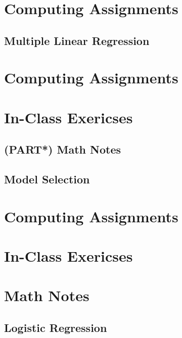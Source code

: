 \documentclass[]{book}
\begin{document}
\part*{Computing
Assignments}\label{part-computing-assignments-1}

\chapter{Multiple Linear Regression}\label{mlr}

\part*{Computing
Assignments}\label{part-computing-assignments-2}

\part*{In-Class Exericses}\label{part-in-class-exericses}

\chapter{(PART*) Math Notes}\label{part-math-notes}

\chapter{Model Selection}\label{select}

\part*{Computing
Assignments}\label{part-computing-assignments-3}

\part*{In-Class Exericses}\label{part-in-class-exericses-1}

\part*{Math Notes}\label{part-math-notes-1}

\chapter{Logistic Regression}\label{logistic}
\end{document}
